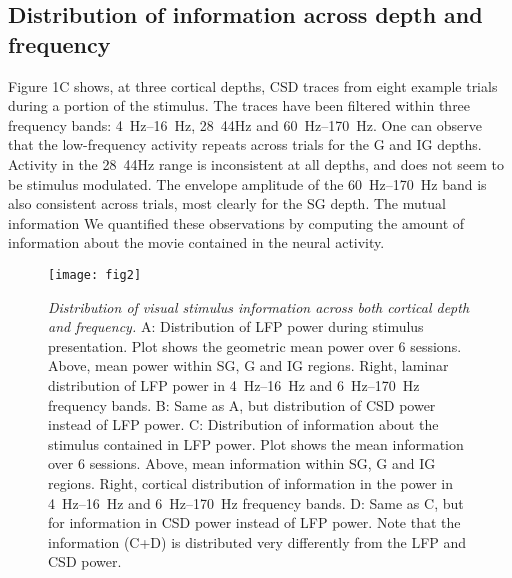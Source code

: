 \subsection{Distribution of information across depth and frequency}
Figure 1C shows, at three cortical depths, \ac{CSD} traces from eight example trials during a portion of the stimulus.
The traces have been filtered within three frequency bands: \SIrange{4}{16}{Hz}, \SI{28}{44}{Hz} and \SIrange{60}{170}{Hz}.
One can observe that the low-frequency activity repeats across trials for the \ac{G} and \ac{IG} depths.
Activity in the \SI{28}{44}{Hz} range is inconsistent at all depths, and does not seem to be stimulus modulated.
The envelope amplitude of the \SIrange{60}{170}{Hz} band is also consistent across trials, most clearly for the \ac{SG} depth.
The mutual information We quantified these observations by computing the amount of information about the movie contained in the neural activity.

\begin{figure}[htbp]
\centering \texttt{[image: fig2]}
%
\caption{%
\textit{Distribution of visual stimulus information across both cortical depth 
and frequency.}
A: Distribution of \ac{LFP} power during stimulus presentation.
Plot shows the geometric mean 
power over 6 sessions.
Above, mean power within \ac{SG}, \ac{G} and \ac{IG} regions.
Right, laminar distribution of \ac{LFP} power in
\SIrange{4}{16}{Hz} and \SIrange{6}{170}{Hz} frequency bands.
B: Same as A, but distribution of \ac{CSD} power instead of \ac{LFP} power.
C: Distribution of information about the stimulus contained in \ac{LFP} power.
Plot 
shows the mean information over 6 sessions.
Above, mean information within \ac{SG}, \ac{G} 
and \ac{IG} regions.
Right, cortical distribution of information in the power in
\SIrange{4}{16}{Hz} and \SIrange{6}{170}{Hz} frequency bands.
D: Same as C, but for information in \ac{CSD} power instead of \ac{LFP} power.
Note that the information (C+D) is distributed very differently from the \ac{LFP} and \ac{CSD} power.}%
\label{fig:lam_2}
\end{figure}

